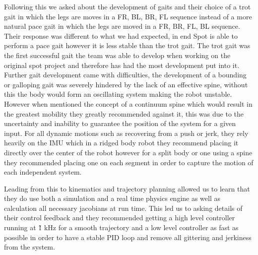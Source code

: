         Following this we asked about the development of gaits and their choice of a trot gait in which the legs are moves in a FR, BL, BR, FL sequence instead of a more natural pace gait in which the legs are moved in a FR, BR, FL, BL sequence. Their response was different to what we had expected, in end Spot is able to perform a pace gait however it is less stable than the trot gait. The trot gait was the first successful gait the team was able to develop when working on the original spot project and therefore has had the most development put into it. Further gait development came with difficulties, the development of a bounding or galloping gait was severely hindered by the lack of an effective spine, without this the body would form an oscillating system making the robot unstable. However when mentioned the concept of a continuum spine which would result in the greatest mobility they greatly recommended against it, this was due to the uncertainty and inability to guarantee the position of the system for a given input. For all dynamic motions such as recovering from a push or jerk, they rely heavily on the IMU which in a ridged body robot they recommend placing it directly over the center of the robot however for a split body or one using a spine they recommended placing one on each segment in order to capture the motion of each independent system. 
        
        Leading from this to kinematics and trajectory planning allowed us to learn that they do use both a simulation and a real time physics engine as well as calculation all necessary jacobians at run time. This led us to asking details of their control feedback and they recommended getting a high level controller running at \~1 kHz for a smooth trajectory and a low level controller as fast as possible in order to have a stable PID loop and remove all gittering and jerkiness from the system. 
    
